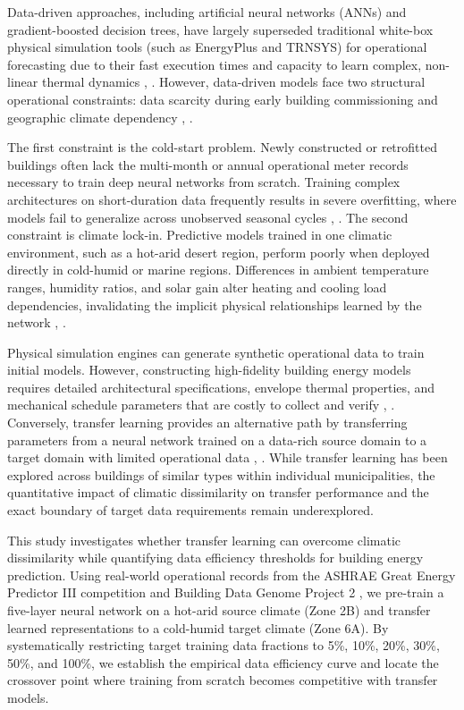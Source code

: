 \documentclass[conference]{IEEEtran}
\begin{document}
Data-driven approaches, including artificial neural networks (ANNs) and gradient-boosted decision trees, have largely superseded traditional white-box physical simulation tools (such as EnergyPlus and TRNSYS) for operational forecasting due to their fast execution times and capacity to learn complex, non-linear thermal dynamics \cite{b6}, \cite{b7}. However, data-driven models face two structural operational constraints: data scarcity during early building commissioning and geographic climate dependency \cite{b5}, \cite{b9}. 

The first constraint is the cold-start problem. Newly constructed or retrofitted buildings often lack the multi-month or annual operational meter records necessary to train deep neural networks from scratch. Training complex architectures on short-duration data frequently results in severe overfitting, where models fail to generalize across unobserved seasonal cycles \cite{b4}, \cite{b13}. The second constraint is climate lock-in. Predictive models trained in one climatic environment, such as a hot-arid desert region, perform poorly when deployed directly in cold-humid or marine regions. Differences in ambient temperature ranges, humidity ratios, and solar gain alter heating and cooling load dependencies, invalidating the implicit physical relationships learned by the network \cite{b15}, \cite{b16}.

Physical simulation engines can generate synthetic operational data to train initial models. However, constructing high-fidelity building energy models requires detailed architectural specifications, envelope thermal properties, and mechanical schedule parameters that are costly to collect and verify \cite{b7}, \cite{b8}. Conversely, transfer learning provides an alternative path by transferring parameters from a neural network trained on a data-rich source domain to a target domain with limited operational data \cite{b3}, \cite{b12}. While transfer learning has been explored across buildings of similar types within individual municipalities, the quantitative impact of climatic dissimilarity on transfer performance and the exact boundary of target data requirements remain underexplored.

This study investigates whether transfer learning can overcome climatic dissimilarity while quantifying data efficiency thresholds for building energy prediction. Using real-world operational records from the ASHRAE Great Energy Predictor III competition \cite{b1} and Building Data Genome Project 2 \cite{b2}, we pre-train a five-layer neural network on a hot-arid source climate (Zone 2B) and transfer learned representations to a cold-humid target climate (Zone 6A). By systematically restricting target training data fractions to 5\%, 10\%, 20\%, 30\%, 50\%, and 100\%, we establish the empirical data efficiency curve and locate the crossover point where training from scratch becomes competitive with transfer models.
\end{document}
